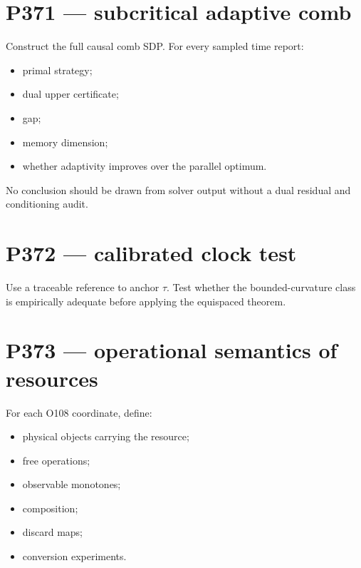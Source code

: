 \documentclass[11pt,a4paper,openany]{report}
\begin{document}
\section{P371 --- subcritical adaptive comb}

Construct the full causal comb SDP. For every sampled time report:

\begin{itemize}
\item 
primal strategy;

\item 
dual upper certificate;

\item 
gap;

\item 
memory dimension;

\item 
whether adaptivity improves over the parallel optimum.

\end{itemize}

No conclusion should be drawn from solver output without a dual residual and conditioning audit.

\section{P372 --- calibrated clock test}

Use a traceable reference to anchor \(\tau\). Test whether the bounded-curvature class is empirically adequate before applying the equispaced theorem.

\section{P373 --- operational semantics of resources}

For each O108 coordinate, define:

\begin{itemize}
\item 
physical objects carrying the resource;

\item 
free operations;

\item 
observable monotones;

\item 
composition;

\item 
discard maps;

\item 
conversion experiments.

\end{itemize}
\end{document}
